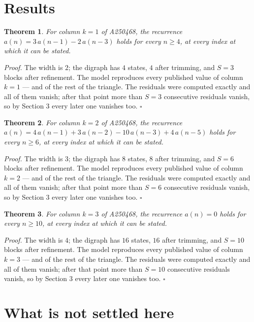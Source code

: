 \documentclass[11pt]{article}
\newtheorem{theorem}{Theorem}
\theoremstyle{definition}
\begin{document}
\section{Results}

\begin{theorem} For column $k = 1$ of A250468, the recurrence $a(n) = 3\,a(n-1) - 2\,a(n-3)$ holds for every $n \ge 4$, at every index at which it can be stated.\end{theorem}

{\itshape Proof.} The width is $2$; the digraph has $4$ states, $4$ after trimming, and $S = 3$ blocks after refinement. The model reproduces every published value of column $k = 1$ --- and of the rest of the triangle. The residuals were computed exactly and all of them vanish; after that point more than $S = 3$ consecutive residuals vanish, so by Section 3 every later one vanishes too. $\square$

\begin{theorem} For column $k = 2$ of A250468, the recurrence $a(n) = 4\,a(n-1) + 3\,a(n-2) - 10\,a(n-3) + 4\,a(n-5)$ holds for every $n \ge 6$, at every index at which it can be stated.\end{theorem}

{\itshape Proof.} The width is $3$; the digraph has $8$ states, $8$ after trimming, and $S = 6$ blocks after refinement. The model reproduces every published value of column $k = 2$ --- and of the rest of the triangle. The residuals were computed exactly and all of them vanish; after that point more than $S = 6$ consecutive residuals vanish, so by Section 3 every later one vanishes too. $\square$

\begin{theorem} For column $k = 3$ of A250468, the recurrence $a(n) = 0$ holds for every $n \ge 10$, at every index at which it can be stated.\end{theorem}

{\itshape Proof.} The width is $4$; the digraph has $16$ states, $16$ after trimming, and $S = 10$ blocks after refinement. The model reproduces every published value of column $k = 3$ --- and of the rest of the triangle. The residuals were computed exactly and all of them vanish; after that point more than $S = 10$ consecutive residuals vanish, so by Section 3 every later one vanishes too. $\square$

\section{What is not settled here}
\end{document}
